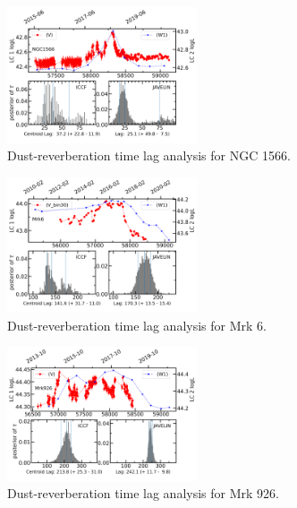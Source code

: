 \documentclass[linenumbers]{aastex631}
\begin{document}
\begin{figure}
\centering
	\includegraphics[width=0.5\textwidth]{pic/NGC1566_lag.png}
    \caption{Dust-reverberation time lag analysis for NGC 1566. }
    \label{fig:lag_NGC1566}
\end{figure}
\begin{figure}
\centering
	\includegraphics[width=0.5\textwidth]{pic/Mrk6lag1.png}
    \caption{Dust-reverberation time lag analysis for Mrk 6. }
    \label{fig:lag_Mrk6}
\end{figure}
\begin{figure}
\centering
	\includegraphics[width=0.5\textwidth]{pic/Mrk926lag.png}
    \caption{Dust-reverberation time lag analysis for Mrk 926. }
    \label{fig:lag_Mrk926}
\end{figure}
\end{document}
